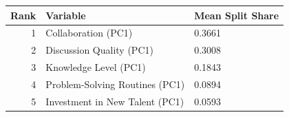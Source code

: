 
\begin{tabular}{rll}
\toprule
Rank & Variable & Mean Split Share\\
\midrule
1 & Collaboration (PC1) & 0.3661\\
2 & Discussion Quality (PC1) & 0.3008\\
3 & Knowledge Level (PC1) & 0.1843\\
4 & Problem-Solving Routines (PC1) & 0.0894\\
5 & Investment in New Talent (PC1) & 0.0593\\
\bottomrule
\end{tabular}

